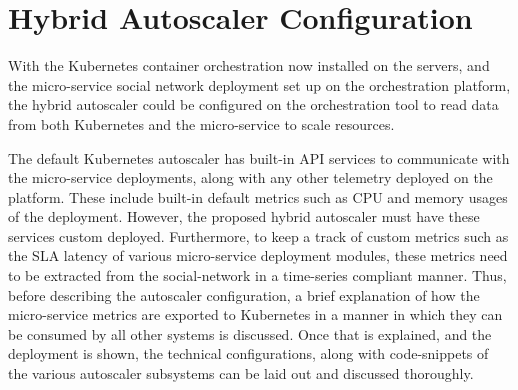 \section{Hybrid Autoscaler Configuration}
\label{sec:ch4-hybrid-auto-arch}



With the Kubernetes container orchestration now installed on the servers, and the micro-service social network deployment set up on the orchestration platform, the hybrid autoscaler could be configured on the orchestration tool to read data from both Kubernetes and the micro-service to scale resources.\par

The default Kubernetes autoscaler has built-in API services to communicate with the micro-service deployments, along with any other telemetry deployed on the platform. These include built-in default metrics such as CPU and memory usages of the deployment. However, the proposed hybrid autoscaler must have these services custom deployed. Furthermore, to keep a track of custom metrics such as the SLA latency of various micro-service deployment modules, these metrics need to be extracted from the social-network in a time-series compliant manner. Thus, before describing the autoscaler configuration, a brief explanation of how the micro-service metrics are exported to Kubernetes in a manner in which they can be consumed by all other systems is discussed. Once that is explained, and the deployment is shown, the technical configurations, along with code-snippets of the various autoscaler subsystems can be laid out and discussed thoroughly.\par

